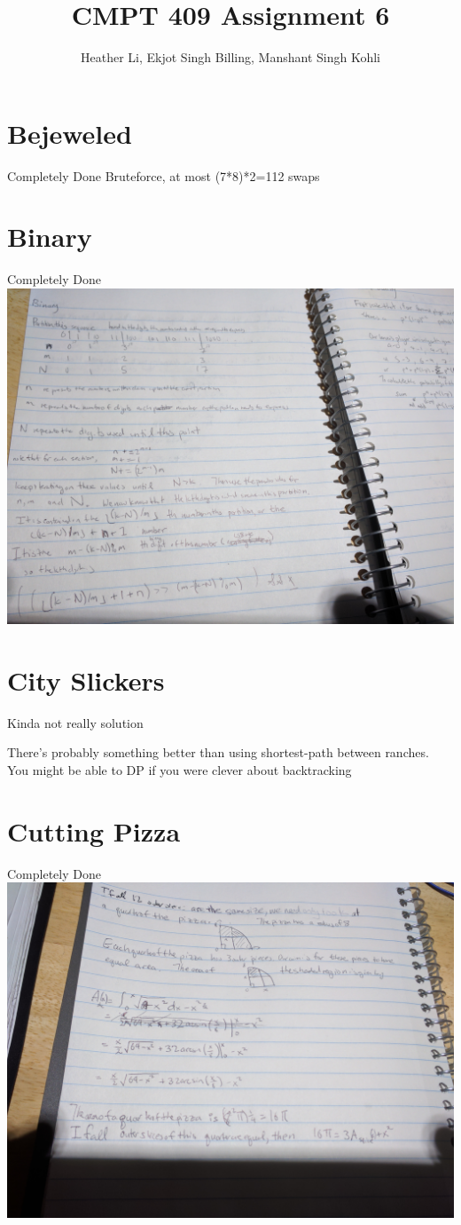 \documentclass{article}
\title{CMPT 409 Assignment 6}
\author{Heather Li, Ekjot Singh Billing, Manshant Singh Kohli}
\begin{document}
\maketitle

\section{Bejeweled}
Completely Done
Bruteforce, at most (7*8)*2=112 swaps



\section{Binary}
Completely Done
\includegraphics[width=.75\textwidth]{binary}

\section{City Slickers}
Kinda not really solution

There's probably something better than using shortest-path between ranches. You might be able to DP if you were clever about backtracking

\section{Cutting Pizza}
Completely Done
\includegraphics[width=.75\textwidth]{pizza}
\end{document}

